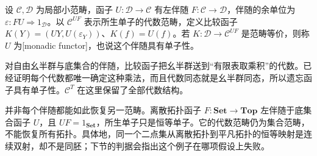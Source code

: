\begin{definition}\label{b4:def:A-monadic-functor}
	设 \(\mathcal C,\mathcal D\) 为局部小范畴，函子 \(U:\mathcal D\to\mathcal C\) 有左伴随 \(F:\mathcal C\to\mathcal D\)，伴随的余单位为 \(\varepsilon:FU\Rightarrow1_{\mathcal D}\)。以 \(\mathcal C^{UF}\) 表示所生单子的代数范畴，定义比较函子 \(K(Y)=(UY,U(\varepsilon_Y))\)、\(K(f)=U(f)\)。若 \(K:\mathcal D\to\mathcal C^{UF}\) 是范畴等价，则称 \(U\) 为[monadic functor]，也说这个伴随具有单子性。
\end{definition}

对自由幺半群与底集合的伴随，比较函子把幺半群送到“有限表取乘积”的代数。已经证明每个代数都唯一确定这种乘法，而且代数同态就是幺半群同态，所以遗忘函子具有单子性。\(\mathcal C^T\) 在这里保留了全部代数结构。

\ProseParagraphBreak

并非每个伴随都能如此恢复另一范畴。离散拓扑函子 \(F:\mathbf{Set}\to\mathbf{Top}\) 左伴随于底集合函子 \(U\)，且 \(UF=1_{\mathbf{Set}}\)，所生单子只是恒等单子。它的代数范畴仍为集合范畴，不能恢复所有拓扑。具体地，同一个二点集从离散拓扑到平凡拓扑的恒等映射是连续双射，却不是同胚；下节的判据会指出这个例子在哪项假设上失败。
